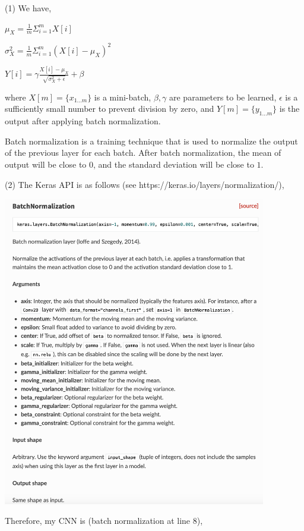 \documentclass[11pt]{article}
\begin{document}
\begin{solution}
(1) We have,
\begin{center}
$\mu_{X} = \frac{1}{m} \Sigma_{i=1}^m X[i]$
\item
$\sigma_{X}^2 = \frac{1}{m} \Sigma_{i=1}^m (X[i]-\mu_X)^2$
\item
$Y[i] = \gamma \frac{X[i] - \mu_X}{\sqrt{\sigma_X^2+\epsilon}}+\beta$
\end{center}
where $X[m] = \{x_{1...m}\}$ is a mini-batch, $\beta, \gamma$ are parameters to be learned, $\epsilon$ is a sufficiently small number to prevent division by zero, and $Y[m] = \{y_{1...m}\}$ is the output after applying batch normalization.
\item Batch normalization is a training technique that is used to normalize the output of the previous layer for each batch. After batch normalization, the mean of output will be close to $0$, and the standard deviation will be close to $1$.
\item(2) The Keras API is as follows (see https://keras.io/layers/normalization/), 
 \begin{center}
\includegraphics[width=11.5cm]{batch.png}
\end{center}
Therefore, my CNN is (batch normalization at line 8),
\begin{center}

\end{center}
\end{solution}
\end{document}
